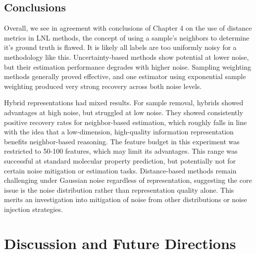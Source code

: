 {\section{Conclusions}


Overall, we see in agreement with conclusions of Chapter 4 on the use of distance metrics in LNL methods, the concept of using a sample's neighbors to determine it's ground truth is flawed. It is likely all labels are too uniformly noisy for a methodology like this. Uncertainty-based methods show potential at lower noise, but their estimation performance degrades with higher noise. Sampling weighting methods generally proved effective, and one estimator using exponential sample weighting produced very strong recovery across both noise levels.  

Hybrid representations had mixed results. For sample removal, hybrids showed advantages at high noise, but struggled at low noise. They showed consistently positive recovery rates for neighbor-based estimation, which roughly falls in line with the idea that a low-dimension, high-quality information representation benefits neighbor-based reasoning. The feature budget in this experiment was restricted to 50-100 features, which may limit its advantages. This range was successful at standard molecular property prediction, but potentially not for certain noise mitigation or estimation tasks. Distance-based methods remain challenging under Gaussian noise regardless of representation, suggesting the core issue is the noise distribution rather than representation quality alone. This merits an investigation into mitigation of noise from other distributions or noise injection strategies.

\chapter{Discussion and Future Directions}\label{chap:discussion}

}
